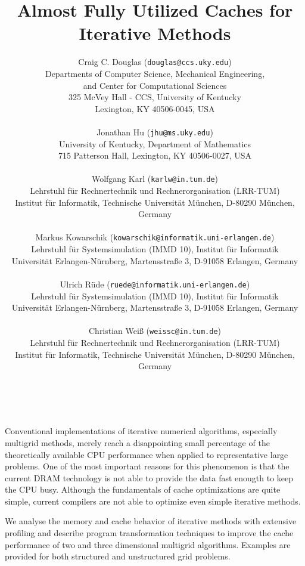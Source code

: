 \documentclass[11pt]{article}
\date{ ~ \hspace{-4mm}}
\title{Almost Fully Utilized Caches for Iterative Methods  }
\author{Craig C. Douglas ({\tt douglas@ccs.uky.edu}) \\ Departments of Computer Science, Mechanical Engineering, \\ and Center for Computational Sciences \\ 325 McVey Hall - CCS, University of Kentucky \\ Lexington, KY 40506-0045, USA \\ \\ Jonathan Hu ({\tt jhu@ms.uky.edu}) \\ University of Kentucky, Department of Mathematics \\ 715 Patterson Hall, Lexington, KY 40506-0027, USA \\ \\ Wolfgang Karl ({\tt karlw@in.tum.de}) \\ Lehrstuhl f\"{u}r Rechnertechnik und Rechnerorganisation (LRR-TUM)  \\  Institut f\"{u}r Informatik, Technische Universit\"{a}t M\"{u}nchen, D-80290 M\"{u}nchen, Germany \\ \\ Markus Kowarschik ({\tt kowarschik@informatik.uni-erlangen.de}) \\ Lehrstuhl f\"{u}r Systemsimulation (IMMD 10), Institut f\"{u}r Informatik  \\  Universit\"{a}t Erlangen-N\"{u}rnberg, Martensstra\ss{}e 3, D-91058 Erlangen, Germany \\ \\ Ulrich R\"{u}de ({\tt ruede@informatik.uni-erlangen.de}) \\ Lehrstuhl f\"{u}r Systemsimulation (IMMD 10), Institut f\"{u}r Informatik  \\  Universit\"{a}t Erlangen-N\"{u}rnberg, Martensstra\ss{}e 3, D-91058 Erlangen, Germany \\ \\ Christian Wei\ss{} ({\tt weissc@in.tum.de}) \\ Lehrstuhl f\"{u}r Rechnertechnik und Rechnerorganisation (LRR-TUM)  \\  Institut f\"{u}r Informatik, Technische Universit\"{a}t M\"{u}nchen, D-80290 M\"{u}nchen, Germany}
\begin{document}
\maketitle
\thispagestyle{empty}



Conventional implementations of iterative numerical algorithms, especially
multigrid methods, merely reach a disappointing small percentage of the
theoretically available CPU performance when applied to representative large
problems.  One of the most important reasons for this phenomenon is that the
current DRAM technology is not able to provide the data fast enougth to keep
the CPU busy.  Although the fundamentals of cache optimizations are quite
simple, current compilers are not able to optimize even simple iterative
methods.





We analyse the memory and cache behavior of iterative methods with extensive
profiling and describe program transformation techniques to improve the cache
performance of two and three dimensional multigrid algorithms.  Examples are
provided for both structured and unstructured grid problems.
\end{document}
